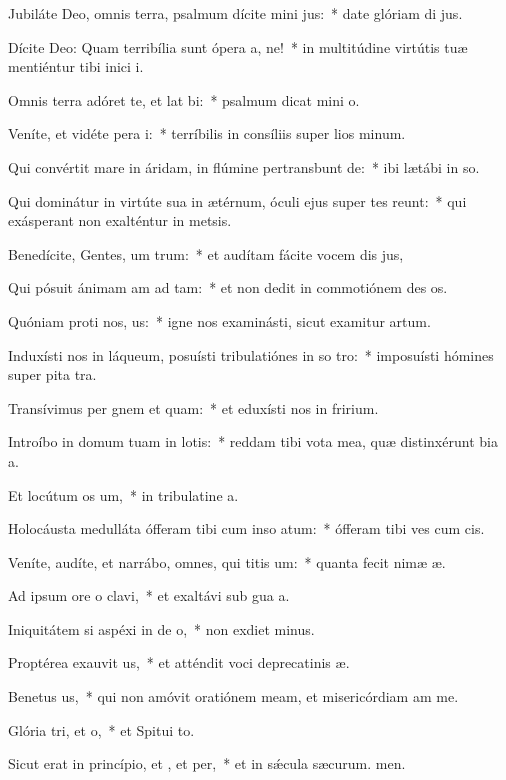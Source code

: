 \item Jubiláte Deo, omnis terra, psalmum dícite mini jus:~* date glóriam di jus.
\item Dícite Deo: Quam terribília sunt ópera a, ne!~* in multitúdine virtútis tuæ mentiéntur tibi inici i.
\item Omnis terra adóret te, et lat bi:~* psalmum dicat mini o.
\item Veníte, et vidéte pera i:~* terríbilis in consíliis super lios minum.
\item Qui convértit mare in áridam, in flúmine pertransbunt de:~* ibi lætábi in so.
\item Qui dominátur in virtúte sua in ætérnum, óculi ejus super tes reunt:~* qui exásperant non exalténtur in metsis.
\item Benedícite, Gentes, um trum:~* et audítam fácite vocem dis jus,
\item Qui pósuit ánimam am ad tam:~* et non dedit in commotiónem des os.
\item Quóniam proti nos, us:~* igne nos examinásti, sicut examitur artum.
\item Induxísti nos in láqueum, posuísti tribulatiónes in so tro:~* imposuísti hómines super pita tra.
\item Transívimus per gnem et quam:~* et eduxísti nos in fririum.
\item Introíbo in domum tuam in lotis:~* reddam tibi vota mea, quæ distinxérunt bia a.
\item Et locútum  os um,~* in tribulatine a.
\item Holocáusta medulláta ófferam tibi cum inso atum:~* ófferam tibi ves cum cis.
\item Veníte, audíte, et narrábo, omnes, qui titis um:~* quanta fecit nimæ æ.
\item Ad ipsum ore o clavi,~* et exaltávi sub gua a.
\item Iniquitátem si aspéxi in de o,~* non exdiet minus.
\item Proptérea exauvit us,~* et atténdit voci deprecatinis æ.
\item Benetus us,~* qui non amóvit oratiónem meam, et misericórdiam am  me.
\item Glória tri, et o,~* et Spitui to.
\item Sicut erat in princípio, et , et per,~* et in sǽcula sæcurum. men.
